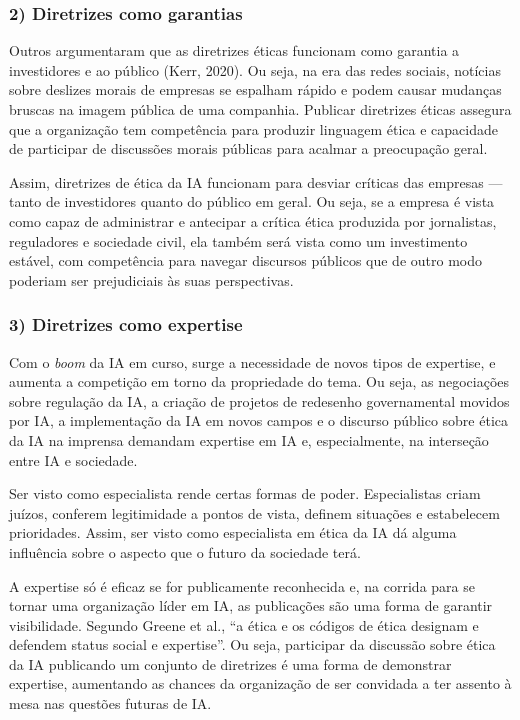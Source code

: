 \documentclass[
  11pt,
]{article}
\begin{document}
\subsubsection{2) Diretrizes como
garantias}\label{diretrizes-como-garantias}

Outros argumentaram que as diretrizes éticas funcionam como garantia a
investidores e ao público (Kerr, 2020). Ou seja, na era das redes
sociais, notícias sobre deslizes morais de empresas se espalham rápido e
podem causar mudanças bruscas na imagem pública de uma companhia.
Publicar diretrizes éticas assegura que a organização tem competência
para produzir linguagem ética e capacidade de participar de discussões
morais públicas para acalmar a preocupação geral.

Assim, diretrizes de ética da IA funcionam para desviar críticas das
empresas --- tanto de investidores quanto do público em geral. Ou seja,
se a empresa é vista como capaz de administrar e antecipar a crítica
ética produzida por jornalistas, reguladores e sociedade civil, ela
também será vista como um investimento estável, com competência para
navegar discursos públicos que de outro modo poderiam ser prejudiciais
às suas perspectivas.

\subsubsection{3) Diretrizes como
expertise}\label{diretrizes-como-expertise}

Com o \emph{boom} da IA em curso, surge a necessidade de novos tipos de
expertise, e aumenta a competição em torno da propriedade do tema. Ou
seja, as negociações sobre regulação da IA, a criação de projetos de
redesenho governamental movidos por IA, a implementação da IA em novos
campos e o discurso público sobre ética da IA na imprensa demandam
expertise em IA e, especialmente, na interseção entre IA e sociedade.

Ser visto como especialista rende certas formas de poder. Especialistas
criam juízos, conferem legitimidade a pontos de vista, definem situações
e estabelecem prioridades. Assim, ser visto como especialista em ética
da IA dá alguma influência sobre o aspecto que o futuro da sociedade
terá.

A expertise só é eficaz se for publicamente reconhecida e, na corrida
para se tornar uma organização líder em IA, as publicações são uma forma
de garantir visibilidade. Segundo Greene et al., ``a ética e os códigos
de ética designam e defendem status social e expertise''. Ou seja,
participar da discussão sobre ética da IA publicando um conjunto de
diretrizes é uma forma de demonstrar expertise, aumentando as chances da
organização de ser convidada a ter assento à mesa nas questões futuras
de IA.
\end{document}
